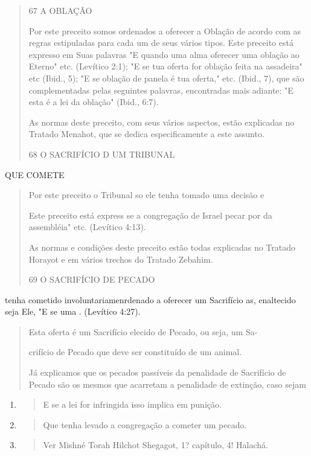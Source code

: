 \begin{quote}
67 A OBLAÇÃO

Por este preceito somos ordenados a oferecer a Oblação de acordo com as
regras estipuladas para cada um de seus vários tipos. Este preceito está
expresso em Suas palavras "E quando uma alma oferecer uma oblação ao
Eter­no" etc. (Levítico 2:1); "E se tua oferta for oblação feita na
assadeira" etc (Ibid., 5); "E se oblação de panela é tua oferta," etc.
(Ibid., 7), que são complementa­das pelas seguintes palavras,
encontradas mais adiante: "E esta é a lei da obla­ção" (Ibid., 6:7).

As normas deste preceito, com seus vários aspectos, estão explica­das no
Tratado Menahot, que se dedica especificamente a este assunto.

68 O SACRIFÍCIO D UM TRIBUNAL
\end{quote}

QUE COMETE

\begin{quote}
Por este preceito o Tribunal so ele tenha tomado uma decisão e

Este preceito está express se a congregação de Israel pecar por da
assembléia" etc. (Levítico 4:13).

As normas e condições deste preceito estão todas explicadas no Tra­tado
Horayot e em vários trechos do Tratado Zebahim.

69 O SACRIFÍCIO DE PECADO
\end{quote}

tenha cometido involuntariamen­rdenado a oferecer um Sacrifício as,
enaltecido seja Ele, "E se uma . (Levítico 4:27).

\begin{quote}
Esta oferta é um Sacrifício elecido de Pecado, ou seja, um Sa-

crifício de Pecado que deve ser constituído de um animal.

Já explicamos que os pecados passíveis da penalidade de Sacrifício de
Pecado são os mesmos que acarretam a penalidade de extinção, caso sejam
\end{quote}

\begin{enumerate}
\def\labelenumi{\arabic{enumi}.}
\setcounter{enumi}{84}
\item
  \begin{quote}
  E se a lei for infringida isso implica em punição.
  \end{quote}
\item
  \begin{quote}
  Que tenha levado a congregação a cometer um pecado.
  \end{quote}
\item
  \begin{quote}
  Ver Mishné Torah Hilchot Shegagot, 1? capítulo, 4! Halachá.
  \end{quote}
\end{enumerate}

